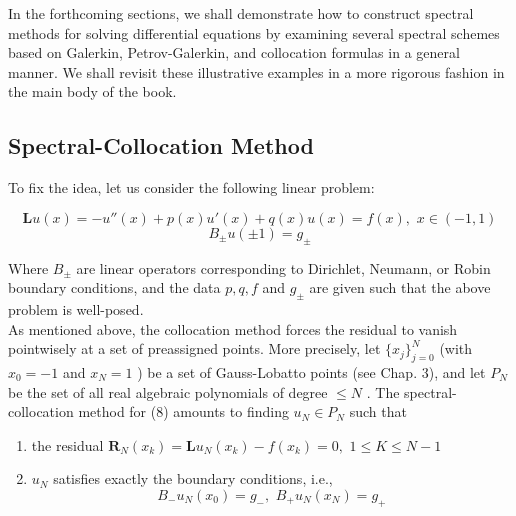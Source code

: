 In the forthcoming sections, we shall demonstrate how to construct spectral methods for solving differential equations by examining several spectral schemes based on Galerkin, Petrov-Galerkin, and collocation formulas in a general manner. We shall revisit these illustrative examples in a more rigorous fashion in the main body of the book.

\subsection{Spectral-Collocation Method}

To fix the idea, let us consider the following linear problem:

\begin{equation}
	\mathbf{ L }u(x) = -u''(x) + p(x) u'(x) + q(x) u(x) = f(x), \hspace{4pt} x \in (-1,1)
\end{equation}
\begin{equation}
	B_{ \pm }u(\pm 1) = g_{ \pm }
\end{equation}

Where $ B_{ \pm } $ are linear operators corresponding to Dirichlet, Neumann, or Robin boundary conditions, and the data $ p,q,f $ and $ g_{ \pm } $ are given such that the above problem is well-posed. \\
\indent As mentioned above, the collocation method forces the residual to vanish pointwisely at a set of preassigned points. More precisely, let $ \{ x_{ j } \}_{ j=0 }^{ N } $ (with $ x_{ 0 }= -1 $ and $ x_{ N } = 1 $ ) be a set of Gauss-Lobatto points (see Chap. 3), and let $ P_{ N } $ be the set of all real algebraic polynomials of degree $ \leq N $ . The spectral-collocation method for (8) amounts to finding $ u_{ N } \in P_{ N } $ such that

\begin{enumerate}
	\item the residual $ \mathbf{ R }_{ N }(x_{ k }) = \mathbf{ L }u_{ N }(x_{ k }) - f(x_{ k }) = 0, \hspace{4pt} 1 \leq K \leq N-1 $ 
	\item $ u_{ N } $ satisfies exactly the boundary conditions, i.e.,
		\begin{equation}
			B_{ - }u_{ N }(x_{ 0 }) = g_{ - }, \hspace{4pt} B_{ + }u_{ N }\left( x_{ N } \right) = g_{ + }
		\end{equation}
\end{enumerate}

